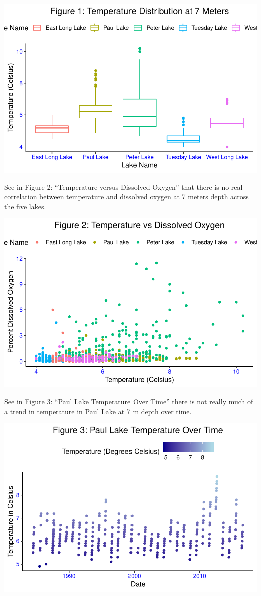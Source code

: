 \documentclass[12pt,]{article}
\begin{document}
\includegraphics{KBollt_ENV872_FinalProject_files/figure-latex/visualization-1.pdf}

See in Figure 2: ``Temperature versus Dissolved Oxygen'' that there is
no real correlation between temperature and dissolved oxygen at 7 meters
depth across the five lakes.

\includegraphics{KBollt_ENV872_FinalProject_files/figure-latex/visualization2-1.pdf}

See in Figure 3: ``Paul Lake Temperature Over Time'' there is not really
much of a trend in temperature in Paul Lake at 7 m depth over time.

\includegraphics{KBollt_ENV872_FinalProject_files/figure-latex/visualization3-1.pdf}
\end{document}
